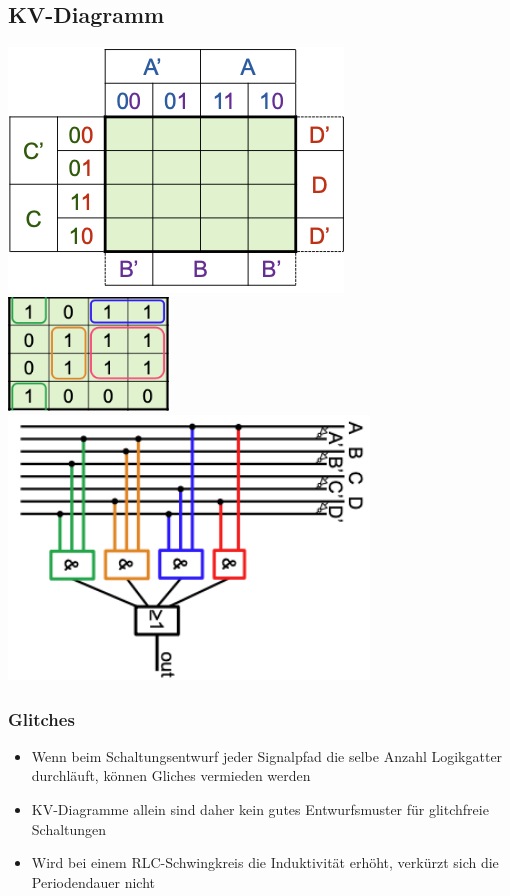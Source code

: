 \documentclass[8pt,a4paper]{scrartcl}
\begin{document}
\begin{multicols*}{3}
				\subsection{KV-Diagramm}
					\includegraphics[height=6.5cm]{img/kv1.png} \\
					\includegraphics[height=3cm]{img/kv2.png} 
					\includegraphics[height=7cm]{img/kv3.png} 
				
				\subsubsection{Glitches}
					\begin{itemize}\itemsep0pt
						\item Wenn beim Schaltungsentwurf jeder Signalpfad die selbe Anzahl Logikgatter durchläuft, können Gliches vermieden werden
						\item KV-Diagramme allein sind daher kein gutes Entwurfsmuster für glitchfreie Schaltungen
						\item Wird bei einem RLC-Schwingkreis die Induktivität erhöht, verkürzt sich die Periodendauer nicht
					\end{itemize}



\end{multicols*}
\end{document}
